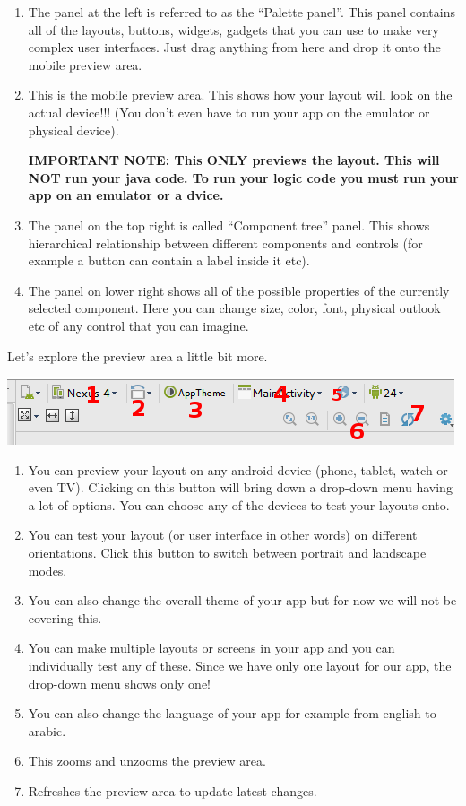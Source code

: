 \begin{enumerate}
	\item The panel at the left is referred to as the ``Palette panel''. This panel contains all of the layouts, buttons, widgets, gadgets that you can use to make very complex user interfaces. Just drag anything from here and drop it onto the mobile preview area.
	\item This is the mobile preview area. This shows how your layout will look on the actual device!!! (You don't even have to run your app on the emulator or physical device). 
	
	\textbf{IMPORTANT NOTE: This ONLY previews the layout. This will NOT run your java code. To run your logic code you must run your app on an emulator or a dvice.}
	\item The panel on the top right is called ``Component tree'' panel. This shows hierarchical relationship between different components and controls (for example a button can contain a label inside it etc). 
	\item The panel on lower right shows all of the possible properties of the currently selected component. Here you can change size, color, font, physical outlook etc of any control that you can imagine.
\end{enumerate}

Let's explore the preview area a little bit more. 

\begin{center}
	\includegraphics[scale=0.6]{chapters/ch02/images/9_design_area}
\end{center}

\begin{enumerate}
	\item You can preview your layout on any android device (phone, tablet, watch or even TV). Clicking on this button will bring down a drop-down menu having a lot of options. You can choose any of the devices to test your layouts onto.
	\item You can test your layout (or user interface in other words) on different orientations. Click this button to switch between portrait and landscape modes.
	\item You can also change the overall theme of your app but for now we will not be covering this.
	\item You can make multiple layouts or screens in your app and you can individually test any of these. Since we have only one layout for our app, the drop-down menu shows only one!
	\item You can also change the language of your app for example from english to arabic.
	\item This zooms and unzooms the preview area.
	\item Refreshes the preview area to update latest changes.
\end{enumerate}

